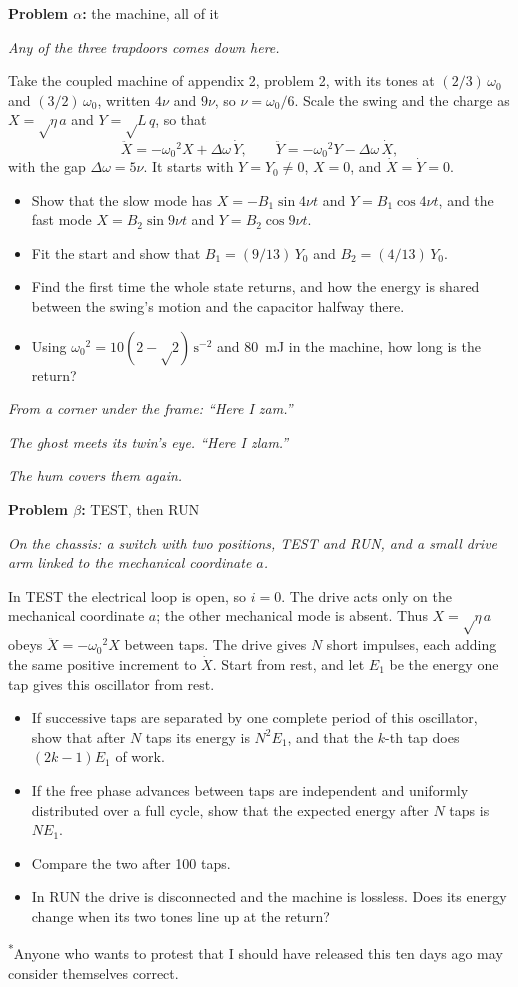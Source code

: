 \documentclass[11pt]{article}
\newcommand{\scene}[1]{\par{\itshape #1}\par}
\newcommand{\problem}[2]{\par\medskip\textbf{Problem #1:} #2\par\nopagebreak}
\newenvironment{parts}{\begin{itemize}[leftmargin=3.4em,labelwidth=2.8em,labelsep=0.6em,align=left,itemsep=3pt,topsep=4pt]}{\end{itemize}}
\newcommand{\pt}[1]{\item[\textbf{#1}]}
\newcommand{\rt}{\text{√}}  %
\begin{document}
\problem{$\alpha$}{the machine, all of it}
\scene{Any of the three trapdoors comes down here.}
Take the coupled machine of appendix 2, problem 2, with its tones at $(2/3)\,\omega_0$ and $(3/2)\,\omega_0$, written $4\nu$ and $9\nu$, so $\nu = \omega_0/6$. Scale the swing and the charge as $X = \rt\eta\,a$ and $Y = \rt L\,q$, so that
\[ \ddot X = -\omega_0{}^2X + \Delta\omega\,\dot Y, \qquad \ddot Y = -\omega_0{}^2Y - \Delta\omega\,\dot X, \]
with the gap $\Delta\omega = 5\nu$. It starts with $Y = Y_0 \ne 0$, $X = 0$, and $\dot X = \dot Y = 0$.
\begin{parts}
\pt{$\alpha$-1} Show that the slow mode has $X = -B_1\sin 4\nu t$ and $Y = B_1\cos 4\nu t$, and the fast mode $X = B_2\sin 9\nu t$ and $Y = B_2\cos 9\nu t$.
\pt{$\alpha$-2} Fit the start and show that $B_1 = (9/13)\,Y_0$ and $B_2 = (4/13)\,Y_0$.
\pt{$\alpha$-3} Find the first time the whole state returns, and how the energy is shared between the swing's motion and the capacitor halfway there.
\pt{$\alpha$-4} Using $\omega_0{}^2 = 10(2 - \rt2)\,\mathrm{s^{-2}}$ and \SI{80}{mJ} in the machine, how long is the return?
\end{parts}
\scene{From a corner under the frame: ``Here I zam.''}
\scene{The ghost meets its twin's eye. ``Here I zlam.''}
\scene{The hum covers them again.}

\clearpage
\problem{$\beta$}{TEST, then RUN}
\scene{On the chassis: a switch with two positions, TEST and RUN, and a small drive arm linked to the mechanical coordinate $a$.}
In TEST the electrical loop is open, so $i = 0$. The drive acts only on the mechanical coordinate $a$; the other mechanical mode is absent. Thus $X = \rt\eta\,a$ obeys $\ddot X = -\omega_0{}^2X$ between taps. The drive gives $N$ short impulses, each adding the same positive increment to $\dot X$. Start from rest, and let $E_1$ be the energy one tap gives this oscillator from rest.
\begin{parts}
\pt{$\beta$-1} If successive taps are separated by one complete period of this oscillator, show that after $N$ taps its energy is $N^2E_1$, and that the $k$-th tap does $(2k - 1)E_1$ of work.
\pt{$\beta$-2} If the free phase advances between taps are independent and uniformly distributed over a full cycle, show that the expected energy after $N$ taps is $NE_1$.
\pt{$\beta$-3} Compare the two after 100 taps.
\pt{$\beta$-4} In RUN the drive is disconnected and the machine is lossless. Does its energy change when its two tones line up at the return?
\end{parts}

\par\vfill{\small\leavevmode\hypertarget{release-note}{}\textsuperscript{*}Anyone who wants to protest that I should have released this ten days ago may consider themselves correct.\par}
\end{document}
